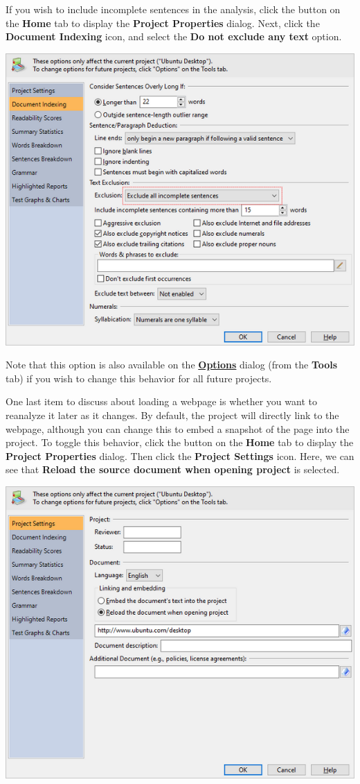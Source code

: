 \documentclass[
]{book}
\theoremstyle{definition}
\theoremstyle{definition}
\theoremstyle{definition}
\theoremstyle{definition}
\theoremstyle{remark}
\begin{document}
If you wish to include incomplete sentences in the analysis, click the  button on the \textbf{Home} tab to display the \textbf{Project Properties} dialog. Next, click the \textbf{Document Indexing} icon, and select the \textbf{Do not exclude any text} option.

\includegraphics{Images/excludeincompletesentences.png}

Note that this option is also available on the \protect\hyperlink{options-overview}{\textbf{Options}} dialog (from the \textbf{Tools} tab) if you wish to change this behavior for all future projects.

One last item to discuss about loading a webpage is whether you want to reanalyze it later as it changes. By default, the project will directly link to the webpage, although you can change this to embed a snapshot of the page into the project. To toggle this behavior, click the  button on the \textbf{Home} tab to display the \textbf{Project Properties} dialog. Then click the \textbf{Project Settings} icon. Here, we can see that \textbf{Reload the source document when opening project} is selected.

\includegraphics{Images/reloadwebpage.png}
\end{document}
